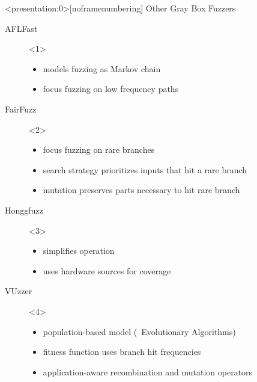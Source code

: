 \documentclass[\HandoutMode,table]{beamer}
\begin{document}
\begin{frame}<presentation:0>[noframenumbering]
    {Other Gray Box Fuzzers}
    \begin{description}
        \item[AFLFast]<1>
            \begin{itemize}
                \item{} models fuzzing as Markov chain
                \item{} focus fuzzing on low frequency paths
            \end{itemize}
        \item[FairFuzz]<2>
            \begin{itemize}
                \item{} focus fuzzing on rare branches
                \item{} search strategy prioritizes inputs that hit a rare branch
                \item{} mutation preserves parts necessary to hit rare branch
            \end{itemize}
        \item[Honggfuzz]<3>
            \begin{itemize}
                \item{} simplifies operation
                \item{} uses hardware sources for coverage
            \end{itemize}
        \item[VUzzer]<4>
            \begin{itemize}
                \item{} population-based model (\ie~Evolutionary Algorithms)
                \item{} fitness function uses branch hit frequencies
                \item{} application-aware recombination and mutation operators
            \end{itemize}
    \end{description}
\end{frame}
\end{document}
